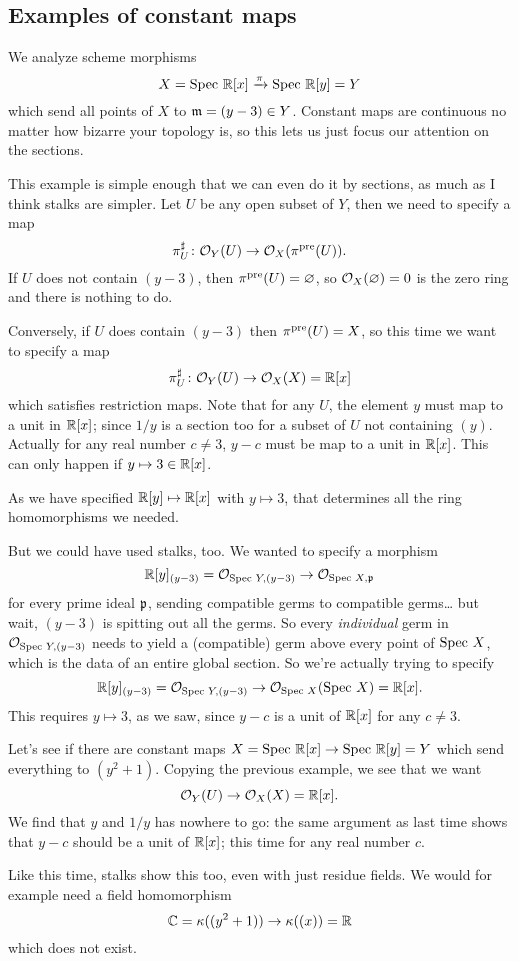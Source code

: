 \subsection{Examples of constant maps}
\begin{example}
	We analyze scheme morphisms
	\[ X = \text{Spec } \mathbb R[x] \xrightarrow{\pi} \text{Spec } \mathbb R[y] = Y \]
	which send all points of $X$ to $\mathfrak m = (y-3) \in Y$.
	Constant maps are continuous no matter how bizarre your topology is,
	so this lets us just focus our attention on the sections.

	This example is simple enough that we can even do it by sections,
	as much as I think stalks are simpler.
	Let $U$ be any open subset of $Y$, then we need to specify a map
	\[ \pi^\sharp_U \colon \mathcal O_Y(U) \to \mathcal O_X(\pi^{\text{pre}}(U)). \]
	If $U$ does not contain $(y-3)$, then $\pi^{\text{pre}}(U) = \varnothing$,
	so $\mathcal O_X(\varnothing) = 0$ is the zero ring and there is nothing to do.

	Conversely, if $U$ does contain $(y-3)$ then $\pi^{\text{pre}}(U) = X$,
	so this time we want to specify a map
	\[ \pi^\sharp_U \colon \mathcal O_Y(U) \to \mathcal O_X(X) = \mathbb R[x] \]
	which satisfies restriction maps.
	Note that for any $U$, the element $y$ must map to a unit in $\mathbb R[x]$;
	since $1/y$ is a section too for a subset of $U$ not containing $(y)$.
	Actually for any real number $c \ne 3$,
	$y-c$ must be map to a unit in $\mathbb R[x]$.
	This can only happen if $y \mapsto 3 \in \mathbb R[x]$.

	As we have specified $\mathbb R[y] \mapsto \mathbb R[x]$ with $y \mapsto 3$,
	that determines all the ring homomorphisms we needed.
\end{example}
But we could have used stalks, too.
We wanted to specify a morphism
\[ \mathbb R[y]_{(y-3)} = \mathcal O_{\text{Spec } Y, (y-3)} \to \mathcal O_{\text{Spec } X, \mathfrak p} \]
for every prime ideal $\mathfrak p$,
sending compatible germs to compatible germs\dots
but wait, $(y-3)$ is spitting out all the germs.
So every \emph{individual} germ in $\mathcal O_{\text{Spec } Y, (y-3)}$
needs to yield a (compatible) germ above every point of $\text{Spec } X$,
which is the data of an entire global section.
So we're actually trying to specify
\[ \mathbb R[y]_{(y-3)} = \mathcal O_{\text{Spec } Y, (y-3)} \to \mathcal O_{\text{Spec } X}(\text{Spec } X) = \mathbb R[x]. \]
This requires $y \mapsto 3$, as we saw,
since $y-c$ is a unit of $\mathbb R[x]$ for any $c \ne 3$.

\begin{example}
	Let's see if there are constant maps
	$X = \text{Spec } \mathbb R[x] \to \text{Spec } \mathbb R[y] = Y$
	which send everything to $(y^2+1)$.
	Copying the previous example, we see that we want
	\[ \mathcal O_Y(U) \to \mathcal O_X(X) = \mathbb R[x]. \]
	We find that $y$ and $1/y$ has nowhere to go:
	the same argument as last time shows that $y-c$ should be a unit of $\mathbb R[x]$;
	this time for any real number $c$.

	Like this time, stalks show this too,
	even with just residue fields.
	We would for example need a field homomorphism
	\[ \mathbb C = \kappa( (y^2+1) ) \to \kappa( (x) ) = \mathbb R \]
	which does not exist.
\end{example}

